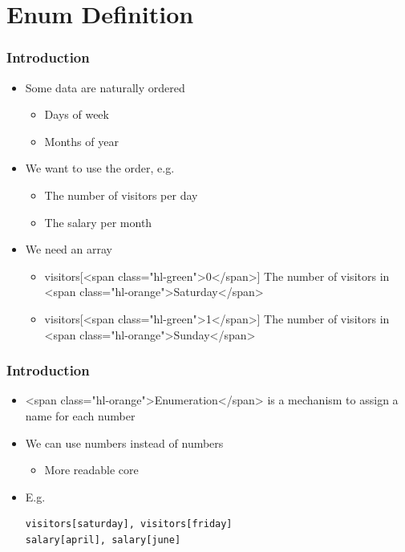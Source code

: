 \documentclass{../c-lecture}
\begin{document}
\section{Enum Definition}

\begin{frame}
  \frametitle{Introduction}
  \begin{itemize}
    \item Some data are naturally ordered
    \begin{itemize}
      \item Days of week
      \item Months of year
    \end{itemize}
    \item We want to use the order, e.g.
    \begin{itemize}
      \item The number of visitors per day
      \item The salary per month
    \end{itemize}
    \item We need an array
    \begin{itemize}
      \item
        visitors[<span class="hl-green">0</span>] \textrightarrow The number of visitors
        in <span class="hl-orange">Saturday</span>

      \item
        visitors[<span class="hl-green">1</span>] \textrightarrow The number of visitors
        in <span class="hl-orange">Sunday</span>

    \end{itemize}
  \end{itemize}
\end{frame}

\begin{frame}[fragile]
  \frametitle{Introduction}
  \begin{itemize}
    \item
      <span class="hl-orange">Enumeration</span> is a mechanism to assign a name
      for each number

    \item We can use numbers instead of numbers
    \begin{itemize}
      \item More readable core
    \end{itemize}
    \item E.g.
    \begin{verbatim}
visitors[saturday], visitors[friday]
salary[april], salary[june]
    \end{verbatim}
  \end{itemize}
\end{frame}
\end{document}
